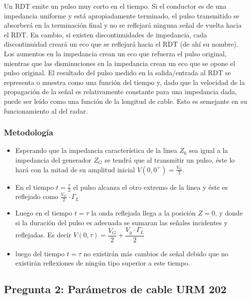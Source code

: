 \documentclass[11pt,onecolumn]{article}
\begin{document}
Un RDT emite un pulso muy corto en el tiempo. Si el conductor es de una impedancia uniforme
y está apropiadamente terminado, el pulso transmitido se absorberá en la terminación final
y no se reflejará ninguna señal de vuelta hacia el RDT. En cambio, si existen
discontinuidades de impedancia, cada discontinuidad creará un eco que se reflejará hacia el
RDT (de ahí su nombre). Los aumentos en la impedancia crean un eco que refuerza el pulso
original, mientras que las disminuciones en la impedancia crean un eco que se opone el
pulso original. El resultado del pulso medido en la salida/entrada al RDT se representa o
muestra como una función del tiempo y, dado que la velocidad de la propagación de la señal
es relativamente constante para una impedancia dada, puede ser leído como una función de la
longitud de cable. Esto es semejante en su funcionamiento al del radar.

\subsubsection{Metodología}

\begin{itemize}
\item Esperando que la impedancia característica de la linea $Z_{0}$ sea igual a la impedancia del generador $Z_{G}$ se tendrá que al transmitir un pulso, éste lo hará con la mitad de su amplitud inicial $ V(0,0^{+}) = \frac{V_{G}}{2}$. 

\item En el tiempo $t = \frac{\tau}{2}$ el pulso alcanza el otro extremo de la linea y éste es reflejado como $\frac{V_{G}}{2} \cdot \Gamma_{L}$


\item Luego en el tiempo $t = \tau$ la onda reflejada llega a la posición $Z = 0$, y donde si la duración del pulso es adecuada se sumaran las señales incidentes y reflejadas. Es decir $V(0,\tau) = \dfrac{V_{G}}{2} + \dfrac{V_{g}\cdot \Gamma_{L}}{2}$ 

\item luego del tiempo $t = \tau$ no existirán más cambios de señal debido que no existirán reflexiones de ningún tipo superior a este tiempo.

\end{itemize}

\newpage

\subsection{Pregunta 2: Parámetros de cable URM 202}
\end{document}
